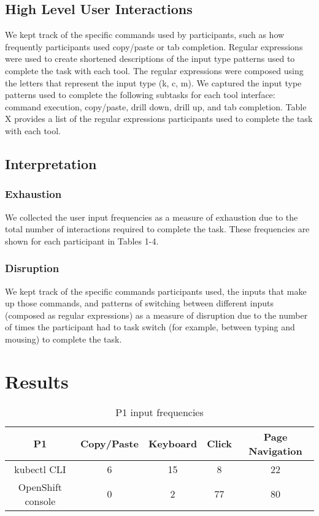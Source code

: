 \documentclass[11pt, oneside]{article}   	%
\begin{document}
\subsection{High Level User Interactions}
We kept track of the specific commands used by participants, such as how frequently participants used copy/paste or tab completion. Regular expressions were used to create shortened descriptions of the input type patterns used to complete the task with each tool. The regular expressions were composed using the letters that represent the input type (k, c, m). We captured the input type patterns used to complete the following subtasks for each tool interface: command execution, copy/paste, drill down, drill up, and tab completion. Table X provides a list of the regular expressions participants used to complete the task with each tool. 

\subsection{Interpretation}
\subsubsection{Exhaustion}
We collected the user input frequencies as a measure of exhaustion due to the total number of interactions required to complete the task. These frequencies are shown for each participant in Tables 1-4.
\subsubsection{Disruption}
We kept track of the specific commands participants used, the inputs that make up those commands, and patterns of switching between different inputs (composed as regular expressions) as a measure of disruption due to the number of times the participant had to task switch (for example, between typing and mousing) to complete the task. 

\section{Results}

\begin{table}
 \centering
  \begin{tabular}{ | c | c | c | c | c | }
  \hline
  P1 & Copy/Paste & Keyboard & Click & Page Navigation \\ 
  \hline
  kubectl CLI & 6 & 15 & 8 & 22 \\ 
  \hline
  OpenShift console & 0 & 2 & 77 & 80 \\ 
  \hline
  \end{tabular}
 \caption{P1 input frequencies}
\end{table}
\end{document}
